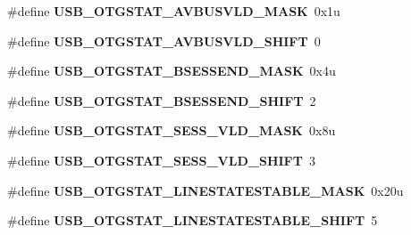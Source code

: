 \begin{DoxyCompactItemize}
\item 
\#define {\bfseries U\+S\+B\+\_\+\+O\+T\+G\+S\+T\+A\+T\+\_\+\+A\+V\+B\+U\+S\+V\+L\+D\+\_\+\+M\+A\+SK}~0x1u\hypertarget{group__USB__Register__Masks_gaad4e0319a6f42042472b52c8d1ec1c77}{}\label{group__USB__Register__Masks_gaad4e0319a6f42042472b52c8d1ec1c77}

\item 
\#define {\bfseries U\+S\+B\+\_\+\+O\+T\+G\+S\+T\+A\+T\+\_\+\+A\+V\+B\+U\+S\+V\+L\+D\+\_\+\+S\+H\+I\+FT}~0\hypertarget{group__USB__Register__Masks_ga66258b09ad8ec5462b8594ce5ac7384c}{}\label{group__USB__Register__Masks_ga66258b09ad8ec5462b8594ce5ac7384c}

\item 
\#define {\bfseries U\+S\+B\+\_\+\+O\+T\+G\+S\+T\+A\+T\+\_\+\+B\+S\+E\+S\+S\+E\+N\+D\+\_\+\+M\+A\+SK}~0x4u\hypertarget{group__USB__Register__Masks_gabcc7c3e58301a6abc07915a5deb92d39}{}\label{group__USB__Register__Masks_gabcc7c3e58301a6abc07915a5deb92d39}

\item 
\#define {\bfseries U\+S\+B\+\_\+\+O\+T\+G\+S\+T\+A\+T\+\_\+\+B\+S\+E\+S\+S\+E\+N\+D\+\_\+\+S\+H\+I\+FT}~2\hypertarget{group__USB__Register__Masks_ga6eb987e49a137057c02e8f2b26e61724}{}\label{group__USB__Register__Masks_ga6eb987e49a137057c02e8f2b26e61724}

\item 
\#define {\bfseries U\+S\+B\+\_\+\+O\+T\+G\+S\+T\+A\+T\+\_\+\+S\+E\+S\+S\+\_\+\+V\+L\+D\+\_\+\+M\+A\+SK}~0x8u\hypertarget{group__USB__Register__Masks_ga9158e279053f0f684c33cba2ec1e68ee}{}\label{group__USB__Register__Masks_ga9158e279053f0f684c33cba2ec1e68ee}

\item 
\#define {\bfseries U\+S\+B\+\_\+\+O\+T\+G\+S\+T\+A\+T\+\_\+\+S\+E\+S\+S\+\_\+\+V\+L\+D\+\_\+\+S\+H\+I\+FT}~3\hypertarget{group__USB__Register__Masks_ga69ae55ac7a03104ed013c34efa24ef43}{}\label{group__USB__Register__Masks_ga69ae55ac7a03104ed013c34efa24ef43}

\item 
\#define {\bfseries U\+S\+B\+\_\+\+O\+T\+G\+S\+T\+A\+T\+\_\+\+L\+I\+N\+E\+S\+T\+A\+T\+E\+S\+T\+A\+B\+L\+E\+\_\+\+M\+A\+SK}~0x20u\hypertarget{group__USB__Register__Masks_ga217f22f350652ae8ad2502c2baf8440b}{}\label{group__USB__Register__Masks_ga217f22f350652ae8ad2502c2baf8440b}

\item 
\#define {\bfseries U\+S\+B\+\_\+\+O\+T\+G\+S\+T\+A\+T\+\_\+\+L\+I\+N\+E\+S\+T\+A\+T\+E\+S\+T\+A\+B\+L\+E\+\_\+\+S\+H\+I\+FT}~5\hypertarget{group__USB__Register__Masks_ga34e5a04fe2a6546a9b22a40dc1f7c543}{}\label{group__USB__Register__Masks_ga34e5a04fe2a6546a9b22a40dc1f7c543}


\end{DoxyCompactItemize}
